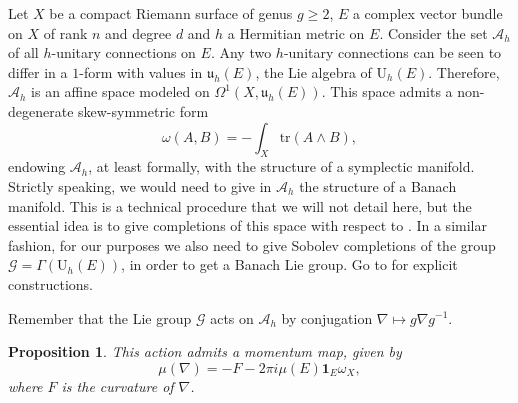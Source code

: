 \documentclass[12pt,a4paper]{book}
\newtheorem{prop}[thm]{Proposition}
\theoremstyle{definition} \newtheorem{defn}[thm]{Definition}
\theoremstyle{definition} \newtheorem{ejemplo}[thm]{Example}
\theoremstyle{remark} \newtheorem{rem}[thm]{Remark}
\def\AA{\mathscr{A}}
\def\GG{\mathscr{G}}
\def\tr{\mathrm{tr}}
\def\id{\mathbf{1}}
\def\UU{\mathrm{U}}
\def\uu{\mathfrak{u}}
\let\emph\relax
\begin{document}
Let $X$ be a compact Riemann surface of genus $g\geq 2$, $E$ a complex vector bundle on $X$ of rank $n$ and degree $d$ and $h$ a Hermitian metric on $E$. Consider the set $\AA_h$ of all $h$-unitary connections on $E$. Any two $h$-unitary connections can be seen to differ in a $1$-form with values in $\uu_h(E)$, the Lie algebra of $\UU_h(E)$. Therefore, $\AA_h$ is an affine space modeled on $\Omega^1(X,\uu_h(E))$. This space admits a non-degenerate skew-symmetric form
\begin{equation*}
  \omega(A,B)=-\int_X \tr(A\wedge B),
\end{equation*}
endowing $\AA_h$, at least formally, with the structure of a symplectic manifold. Strictly speaking, we would need to give in $\AA_h$ the structure of a Banach manifold. This is a technical procedure that we will not detail here, but the essential idea is to give completions of this space with respect to \emph{Sobolev norms}. In a similar fashion, for our purposes we also need to give Sobolev completions of the group $\GG=\Gamma(\UU_h(E))$, in order to get a Banach Lie group. Go to \cite{atiyahbott,kobayashi} for explicit constructions.

Remember that the Lie group $\GG$ acts on $\AA_h$ by conjugation $\nabla\mapsto g\nabla g^{-1}$. 
\begin{prop}
  This action admits a momentum map, given by
\begin{equation*}
  \mu(\nabla)=-F-2\pi i \mu(E) \id_E \omega_X,
\end{equation*}
where $F$ is the curvature of $\nabla$.
\end{prop}
\end{document}
